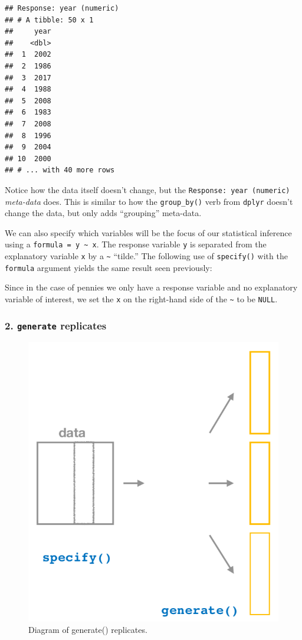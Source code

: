 \documentclass[
]{book}
\newenvironment{Shaded}{\begin{snugshade}}{\end{snugshade}}
\newcommand{\DataTypeTok}[1]{\textcolor[rgb]{0.13,0.29,0.53}{#1}}
\newcommand{\KeywordTok}[1]{\textcolor[rgb]{0.13,0.29,0.53}{\textbf{#1}}}
\newcommand{\NormalTok}[1]{#1}
\newcommand{\OperatorTok}[1]{\textcolor[rgb]{0.81,0.36,0.00}{\textbf{#1}}}
\newcommand{\OtherTok}[1]{\textcolor[rgb]{0.56,0.35,0.01}{#1}}
\newcommand{\StringTok}[1]{\textcolor[rgb]{0.31,0.60,0.02}{#1}}
\begin{document}
\begin{verbatim}
## Response: year (numeric)
## # A tibble: 50 x 1
##     year
##    <dbl>
##  1  2002
##  2  1986
##  3  2017
##  4  1988
##  5  2008
##  6  1983
##  7  2008
##  8  1996
##  9  2004
## 10  2000
## # ... with 40 more rows
\end{verbatim}

Notice how the data itself doesn't change, but the \texttt{Response:\ year\ (numeric)} \emph{meta-data} does. This is similar to how the \texttt{group\_by()} verb from \texttt{dplyr} doesn't change the data, but only adds ``grouping'' meta-data.

We can also specify which variables will be the focus of our statistical inference using a \texttt{formula\ =\ y\ \textasciitilde{}\ x}. The response variable \texttt{y} is separated from the explanatory variable \texttt{x} by a \texttt{\textasciitilde{}} ``tilde.'' The following use of \texttt{specify()} with the \texttt{formula} argument yields the same result seen previously:

\begin{Shaded}
\end{Shaded}

Since in the case of pennies we only have a response variable and no explanatory variable of interest, we set the \texttt{x} on the right-hand side of the \texttt{\textasciitilde{}} to be \texttt{NULL}.

\hypertarget{generate-replicates}{%
\subsubsection*{\texorpdfstring{2. \texttt{generate} replicates}{2. generate replicates}}\label{generate-replicates}}

\begin{figure}

{\centering \includegraphics[width=0.5\linewidth]{images/flowcharts/infer/generate} 

}

\caption{Diagram of generate() replicates.}\label{fig:infer-generate}
\end{figure}
\end{document}
